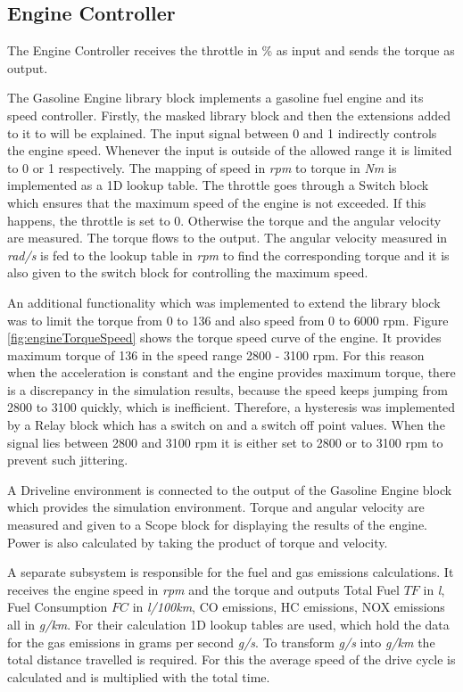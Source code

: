 \subsection{Engine Controller}
The Engine Controller receives the throttle in \% as input and sends the torque as output. 

The Gasoline Engine library block implements a gasoline fuel engine and its speed controller. Firstly, the masked library block and then the extensions added to it to will be explained. The input signal between 0 and 1 indirectly controls the engine speed. Whenever the input is outside of the allowed range it is limited to 0 or 1 respectively. The mapping of speed in \textit{rpm} to torque in \textit{Nm} is implemented as a 1D lookup table. The throttle goes through a Switch block which ensures that the maximum speed of the engine is not exceeded. If this happens, the throttle is set to 0. Otherwise the torque and the angular velocity are measured. The torque flows to the output. The angular velocity measured in \textit{rad/s} is fed to the lookup table in \textit{rpm} to find the corresponding torque and it is also given to the switch block for controlling the maximum speed.

An additional functionality which was implemented to extend the library block was to limit the torque from 0 to 136 and also speed from 0 to 6000 rpm. Figure \ref{fig:engineTorqueSpeed} shows the torque speed curve of the engine. It provides maximum torque of 136 in the speed range 2800 - 3100 rpm. For this reason when the acceleration is constant and the engine provides maximum torque, there is a discrepancy in the simulation results, because the speed keeps jumping from 2800 to 3100 quickly, which is inefficient. Therefore, a hysteresis was implemented by a Relay block which has a switch on and a switch off point values. When the signal lies between 2800 and 3100 rpm it is either set to 2800 or to 3100 rpm to prevent such jittering.

A Driveline environment is connected to the output of the Gasoline Engine block which provides the simulation environment. Torque and angular velocity are measured and given to a Scope block for displaying the results of the engine. Power is also calculated by taking the product of torque and velocity.

A separate subsystem is responsible for the fuel and gas emissions calculations. It receives the engine speed in \textit{rpm} and the torque and outputs Total Fuel $TF$ in \textit{l}, Fuel Consumption $FC$ in \textit{l/100km}, CO emissions, HC emissions, NOX emissions all in \textit{g/km}. For their calculation 1D lookup tables are used, which hold the data for the gas emissions in grams per second \textit{g/s}. To transform \textit{g/s} into \textit{g/km} the total distance travelled is required. For this the average speed of the drive cycle is calculated and is multiplied with the total time. 


